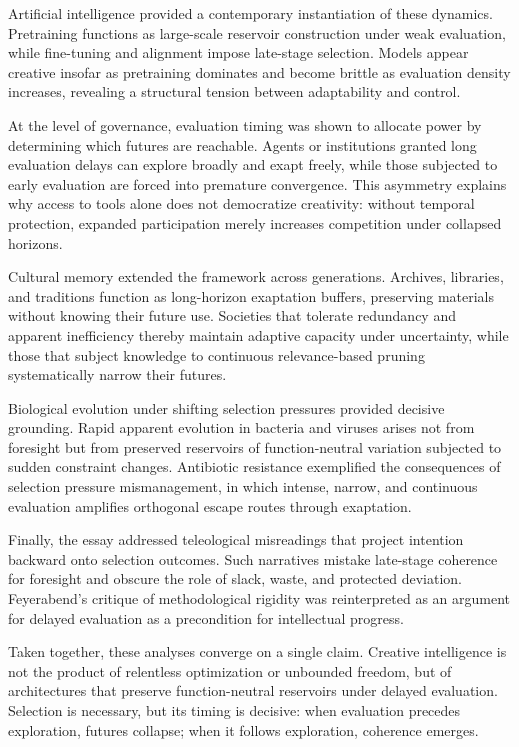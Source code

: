 \documentclass[11pt]{article}
\theoremstyle{definition}
\begin{document}
Artificial intelligence provided a contemporary instantiation of these dynamics. Pretraining functions as large-scale reservoir construction under weak evaluation, while fine-tuning and alignment impose late-stage selection. Models appear creative insofar as pretraining dominates and become brittle as evaluation density increases, revealing a structural tension between adaptability and control.

At the level of governance, evaluation timing was shown to allocate power by determining which futures are reachable. Agents or institutions granted long evaluation delays can explore broadly and exapt freely, while those subjected to early evaluation are forced into premature convergence. This asymmetry explains why access to tools alone does not democratize creativity: without temporal protection, expanded participation merely increases competition under collapsed horizons.

Cultural memory extended the framework across generations. Archives, libraries, and traditions function as long-horizon exaptation buffers, preserving materials without knowing their future use. Societies that tolerate redundancy and apparent inefficiency thereby maintain adaptive capacity under uncertainty, while those that subject knowledge to continuous relevance-based pruning systematically narrow their futures.

Biological evolution under shifting selection pressures provided decisive grounding. Rapid apparent evolution in bacteria and viruses arises not from foresight but from preserved reservoirs of function-neutral variation subjected to sudden constraint changes. Antibiotic resistance exemplified the consequences of selection pressure mismanagement, in which intense, narrow, and continuous evaluation amplifies orthogonal escape routes through exaptation.

Finally, the essay addressed teleological misreadings that project intention backward onto selection outcomes. Such narratives mistake late-stage coherence for foresight and obscure the role of slack, waste, and protected deviation. Feyerabend’s critique of methodological rigidity was reinterpreted as an argument for delayed evaluation as a precondition for intellectual progress.

Taken together, these analyses converge on a single claim. Creative intelligence is not the product of relentless optimization or unbounded freedom, but of architectures that preserve function-neutral reservoirs under delayed evaluation. Selection is necessary, but its timing is decisive: when evaluation precedes exploration, futures collapse; when it follows exploration, coherence emerges.
\end{document}
